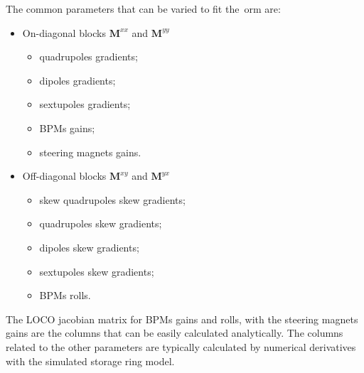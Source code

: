The common parameters that can be varied to fit the~\gls{orm} are:
\begin{itemize}
    \item On-diagonal blocks $\mathbf{M}^{xx}$ and $\mathbf{M}^{yy}$
    \begin{itemize}
        \item quadrupoles gradients;
        \item dipoles gradients;
        \item sextupoles gradients;
        \item BPMs gains;
        \item steering magnets gains.
    \end{itemize}
    \item Off-diagonal blocks $\mathbf{M}^{xy}$ and $\mathbf{M}^{yx}$
    \begin{itemize}
        \item skew quadrupoles skew gradients;
        \item quadrupoles skew gradients;
        \item dipoles skew gradients;
        \item sextupoles skew gradients;
        \item BPMs rolls.
    \end{itemize}
\end{itemize}
The LOCO jacobian matrix for BPMs gains and rolls, with the steering magnets gains are the columns that can be easily calculated analytically. The columns related to the other parameters are typically calculated by numerical derivatives with the simulated storage ring model. 

